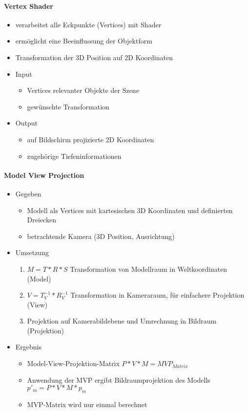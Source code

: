 \documentclass[10pt,landscape]{article}
\begin{document}
\begin{multicols}{3}
  \paragraph{Vertex Shader}
  \begin{itemize}
    \item verarbeitet alle Eckpunkte (Vertices) mit Shader
    \item ermöglicht eine Beeinflussung der Objektform
    \item Transformation der 3D Position auf 2D Koordinaten
    \item Input
          \begin{itemize}
            \item Vertices relevanter Objekte der Szene
            \item gewünschte Transformation
          \end{itemize}
    \item Output
          \begin{itemize}
            \item auf Bildschirm projizierte 2D Koordinaten
            \item zugehörige Tiefeninformationen
          \end{itemize}
  \end{itemize}
  
  \paragraph{Model View Projection}
  \begin{itemize}
    \item Gegeben
          \begin{itemize}
            \item Modell als Vertices mit kartesischen 3D Koordinaten und definierten Dreiecken
            \item betrachtende Kamera (3D Position, Ausrichtung)
          \end{itemize}
    \item Umsetzung
          \begin{enumerate}
            \item $M=T*R*S$ Transformation von Modellraum in Weltkoordinaten (Model)
            \item $V=T_V^{-1}*R_V^{-1}$ Transformation in Kameraraum, für einfachere Projektion (View)
            \item Projektion auf Kamerabildebene und Umrechnung in Bildraum (Projektion)
          \end{enumerate}
    \item Ergebnis
          \begin{itemize}
            \item Model-View-Projektion-Matrix $P*V*M=MVP_{Matrix}$
            \item Anwendung der MVP ergibt Bildraumprojektion des Modells $p'_m=P*V*M*p_m$
            \item MVP-Matrix wird nur einmal berechnet
          \end{itemize}
  \end{itemize}
  

\end{multicols}
\end{document}
